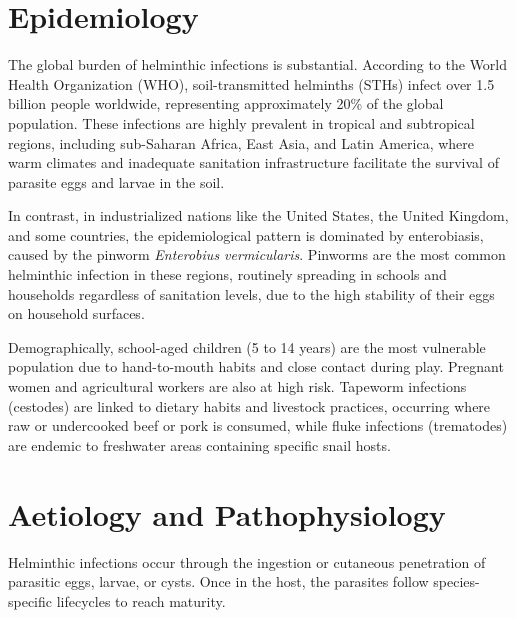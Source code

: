 \section*{Epidemiology}
The global burden of helminthic infections is substantial. According to the World Health Organization (WHO), soil-transmitted helminths (STHs) infect over 1.5 billion people worldwide, representing approximately 20\% of the global population. These infections are highly prevalent in tropical and subtropical regions, including sub-Saharan Africa, East Asia, and Latin America, where warm climates and inadequate sanitation infrastructure facilitate the survival of parasite eggs and larvae in the soil.

In contrast, in industrialized nations like the United States, the United Kingdom, and some countries, the epidemiological pattern is dominated by enterobiasis, caused by the pinworm \textit{Enterobius vermicularis}. Pinworms are the most common helminthic infection in these regions, routinely spreading in schools and households regardless of sanitation levels, due to the high stability of their eggs on household surfaces.

Demographically, school-aged children (5 to 14 years) are the most vulnerable population due to hand-to-mouth habits and close contact during play. Pregnant women and agricultural workers are also at high risk. Tapeworm infections (cestodes) are linked to dietary habits and livestock practices, occurring where raw or undercooked beef or pork is consumed, while fluke infections (trematodes) are endemic to freshwater areas containing specific snail hosts.

\section*{Aetiology and Pathophysiology}
Helminthic infections occur through the ingestion or cutaneous penetration of parasitic eggs, larvae, or cysts. Once in the host, the parasites follow species-specific lifecycles to reach maturity.

